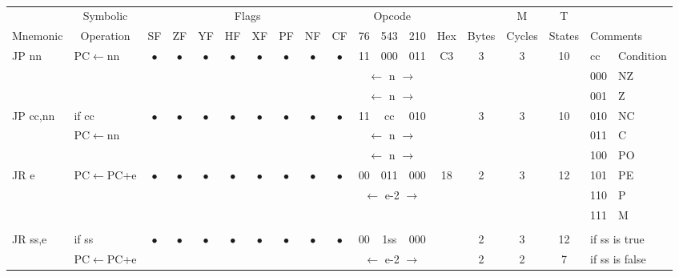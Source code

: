 \documentclass[oneside,a4paper]{book}
\begin{document}
{\tt \scriptsize \setlength{\fboxsep}{0.25mm}
\setlength{\tabcolsep}{1mm}
\begin{tabular}{llc@{ }c@{ }c@{ }c@{ }c@{ }c@{ }c@{ }cc@{ }c@{ }cccccll}\hline
 & \multicolumn{1}{c}{Symbolic} & \multicolumn{8}{c}{Flags} & \multicolumn{3}{c}{Opcode} & & & M & T & \\
Mnemonic & \multicolumn{1}{c}{Operation} & SF & ZF & YF & HF & XF & PF & NF & CF & 76 & 543 & 210 
	& Hex & Bytes & Cycles & States & \multicolumn{2}{l}{Comments} \\ \hline

JP nn & PC$\leftarrow$nn &
	$\bullet$ & $\bullet$ & $\bullet$ & $\bullet$ & $\bullet$ & $\bullet$ & $\bullet$ & $\bullet$ & 11 & 000 & 011
	& C3 & 3 & 3 & 10 & cc & Condition \\ \cline{18-19}
\multicolumn{10}{c}{} & \multicolumn{3}{c}{$\leftarrow$ n $\rightarrow$} & \multicolumn{4}{c}{} & 000 & NZ \\
\multicolumn{10}{c}{} & \multicolumn{3}{c}{$\leftarrow$ n $\rightarrow$} & \multicolumn{4}{c}{} & 001 & Z \\

JP cc,nn & if cc &
	$\bullet$ & $\bullet$ & $\bullet$ & $\bullet$ & $\bullet$ & $\bullet$ & $\bullet$ & $\bullet$ & 11 & cc & 010
	& & 3 & 3 & 10 & 010 & NC \\ 
& PC$\leftarrow$nn & \multicolumn{8}{c}{} & \multicolumn{3}{c}{$\leftarrow$ n $\rightarrow$} & \multicolumn{4}{c}{} & 011 & C \\
\multicolumn{10}{c}{} & \multicolumn{3}{c}{$\leftarrow$ n $\rightarrow$} & \multicolumn{4}{c}{} & 100 & PO \\

JR e & PC$\leftarrow$PC+e &
	$\bullet$ & $\bullet$ & $\bullet$ & $\bullet$ & $\bullet$ & $\bullet$ & $\bullet$ & $\bullet$ & 00 & 011 & 000
	& 18 & 2 & 3 & 12 & 101 & PE \\
\multicolumn{10}{c}{} & \multicolumn{3}{c}{$\leftarrow$ e-2 $\rightarrow$} & \multicolumn{4}{c}{} & 110 & P \\
\multicolumn{17}{c}{} & 111 & M \\
\multicolumn{17}{c}{} & & \\

JR ss,e & if ss &
	$\bullet$ & $\bullet$ & $\bullet$ & $\bullet$ & $\bullet$ & $\bullet$ & $\bullet$ & $\bullet$ & 00 & 1ss & 000
	& & 2 & 3 & 12 & \multicolumn{2}{l}{if ss is true} \\
 & PC$\leftarrow$PC+e & \multicolumn{8}{c}{} & \multicolumn{3}{c}{$\leftarrow$ e-2 $\rightarrow$} & & 2 & 2 & 7 & 
	\multicolumn{2}{l}{if ss is false} \\


\end{tabular}}
\end{document}
